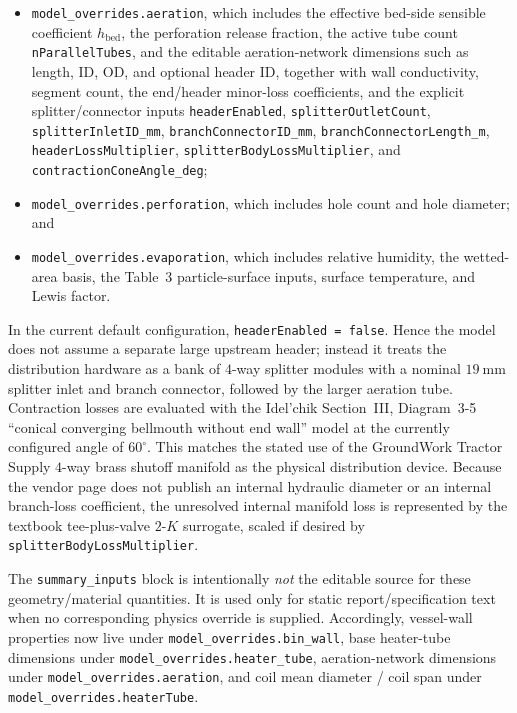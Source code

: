 \documentclass{article}
\begin{document}
\begin{itemize}
      \texttt{coilSpan\_m};
\item \texttt{model\_overrides.aeration}, which includes the effective
      bed-side sensible coefficient $h_{\text{bed}}$, the perforation
      release fraction, the active tube count \texttt{nParallelTubes}, and
      the editable aeration-network dimensions such as length, ID, OD, and
      optional header ID, together with wall conductivity, segment count,
      the end/header minor-loss coefficients, and the explicit
      splitter/connector inputs
      \texttt{headerEnabled}, \texttt{splitterOutletCount},
      \texttt{splitterInletID\_mm}, \texttt{branchConnectorID\_mm},
      \texttt{branchConnectorLength\_m},
      \texttt{headerLossMultiplier},
      \texttt{splitterBodyLossMultiplier}, and
      \texttt{contractionConeAngle\_deg};
\item \texttt{model\_overrides.perforation}, which includes hole count and
      hole diameter; and
\item \texttt{model\_overrides.evaporation}, which includes relative
      humidity, the wetted-area basis, the Table~3 particle-surface inputs,
      surface temperature, and Lewis factor.
\end{itemize}

In the current default configuration, \texttt{headerEnabled = false}. Hence
the model does not assume a separate large upstream header; instead it
treats the distribution hardware as a bank of $4$-way splitter modules with
a nominal $19\ \mathrm{mm}$ splitter inlet and branch connector, followed by
the larger aeration tube. Contraction losses are evaluated with the
Idel'chik Section~III, Diagram~3-5 ``conical converging bellmouth without
end wall'' model at the currently configured angle of $60^\circ$. This
matches the stated use of the GroundWork
Tractor Supply $4$-way brass shutoff manifold as the physical distribution
device. Because the vendor page does not publish an internal hydraulic
diameter or an internal branch-loss coefficient, the unresolved internal
manifold loss is represented by the textbook tee-plus-valve \(2\)-\(K\)
surrogate, scaled if desired by \texttt{splitterBodyLossMultiplier}.

The \texttt{summary\_inputs} block is intentionally \emph{not} the editable
source for these geometry/material quantities. It is used only for static
report/specification text when no corresponding physics override is supplied.
Accordingly, vessel-wall properties now live under
\texttt{model\_overrides.bin\_wall}, base heater-tube dimensions under
\texttt{model\_overrides.heater\_tube}, aeration-network dimensions under
\texttt{model\_overrides.aeration}, and coil mean diameter / coil span under
\texttt{model\_overrides.heaterTube}.
\end{document}
